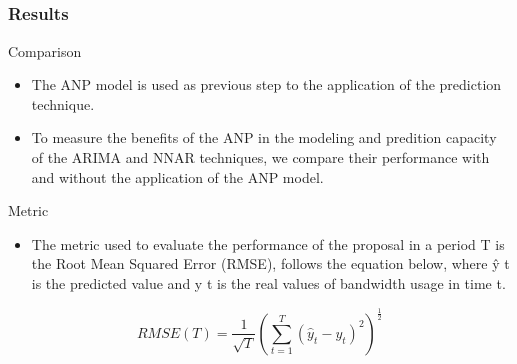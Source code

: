 \documentclass[aspectratio=169]{beamer}
\begin{document}
\subsection{}
\begin{frame}
\frametitle{Results}
\small
\begin{block}{Comparison}
\begin{itemize} \small
    \item The ANP model is used as previous step to the application of the prediction technique.
    \item To measure the benefits of the ANP in the modeling and predition capacity of the ARIMA and NNAR techniques, we compare their performance with and without the application of the ANP model. 
\end{itemize}
\end{block}

\begin{block}{Metric}
\begin{itemize} \small
    \item The metric used to evaluate the performance of the proposal in a period T is the Root Mean Squared Error (RMSE), follows the equation below, where ŷ t is the predicted value and y t is the real values of bandwidth usage in time t.
\end{itemize}

\begin{equation}
RMSE(T) = \frac{1}{\sqrt{T}} (\sum_{t=1}^{T} (\hat{y}_t - y_t)^2)^\frac{1}{2}    
\end{equation}

\end{block}
\end{frame}

\end{document}
